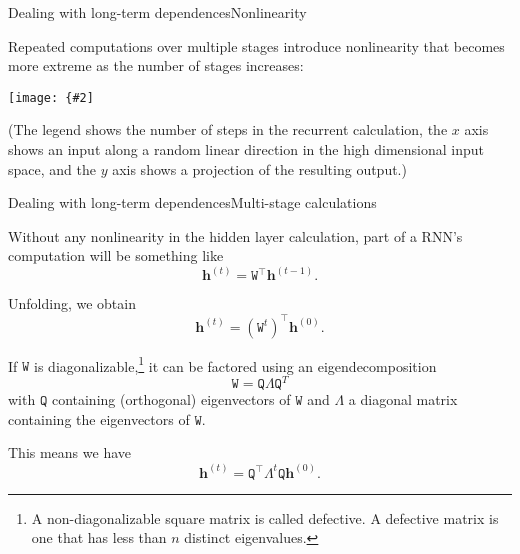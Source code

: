 \documentclass{beamer}
\renewcommand{\vec}[1]{\boldsymbol{#1}}
\newcommand{\mat}[1]{\mathtt{#1}}
\newcommand{\T}[0]{\top}
\newcommand{\myfig}[3]{\centerline{\texttt{[image: \{\#2]}}}
    \centerline{\scriptsize #3}}
\begin{document}
\begin{frame}{Dealing with long-term dependences}{Nonlinearity}

  Repeated computations over multiple stages introduce nonlinearity
  that becomes more extreme as the number of stages increases:

  \medskip
  
  \myfig{3in}{goodfellow-fig10-15}{Goodfellow, Bengio, and Courville (2016), Fig.\ 10.15}

  (The legend shows the number of steps in the recurrent calculation,
  the $x$ axis shows an input along a random linear direction in the
  high dimensional input space, and the $y$ axis shows a projection of
  the resulting output.)
  
\end{frame}


\begin{frame}{Dealing with long-term dependences}{Multi-stage calculations}

  Without any nonlinearity in the hidden layer calculation, part of
  a RNN's computation will be
  something like
  \[ \vec{h}^{(t)} = \mat{W}^\T \vec{h}^{(t-1)}. \]

  Unfolding, we obtain
  \[ \vec{h}^{(t)} = \left( \mat{W}^t \right)^\T \vec{h}^{(0)}. \]

  If $\mat{W}$ is diagonalizable,\footnote{A non-diagonalizable square
    matrix is called \alert{defective}. A defective matrix is one that
    has less than $n$ distinct eigenvalues.}  it can be factored using
  an eigendecomposition
  \[ \mat{W} = \mat{Q} \mat{\Lambda} \mat{Q}^T \]
  with $\mat{Q}$ containing (orthogonal) eigenvectors of $\mat{W}$
  and $\mat{\Lambda}$ a diagonal matrix containing the eigenvectors
  of $\mat{W}$.

  \medskip

  This means we have
  \[ \vec{h}^{(t)} = \mat{Q}^\T\mat{\Lambda}^t\mat{Q} \vec{h}^{(0)}. \]
  
\end{frame}
\end{document}
